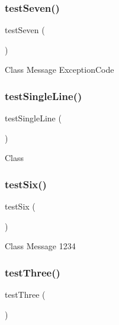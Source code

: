 \subsubsection{\texorpdfstring{test\+Seven()}{testSeven()}}
{\footnotesize\ttfamily test\+Seven (\begin{DoxyParamCaption}{ }\end{DoxyParamCaption})}

Class  Message  Exception\+Code \mbox{\label{class_exception_test_a4c90a8d3690532dd044c150c200bd7da}} 
\subsubsection{\texorpdfstring{test\+Single\+Line()}{testSingleLine()}}
{\footnotesize\ttfamily test\+Single\+Line (\begin{DoxyParamCaption}{ }\end{DoxyParamCaption})}

Class \mbox{\label{class_exception_test_ace022eea5b5fa83b441021bf6337a76b}} 
\subsubsection{\texorpdfstring{test\+Six()}{testSix()}}
{\footnotesize\ttfamily test\+Six (\begin{DoxyParamCaption}{ }\end{DoxyParamCaption})}

Class  Message  1234 \mbox{\label{class_exception_test_a0bd6c752e665cd0e690512ca38d15d41}} 
\subsubsection{\texorpdfstring{test\+Three()}{testThree()}}
{\footnotesize\ttfamily test\+Three (\begin{DoxyParamCaption}{ }\end{DoxyParamCaption})}

